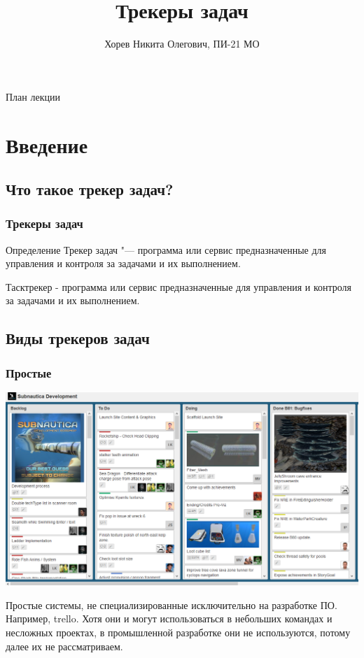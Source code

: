 \documentclass{../industrial-development}
\title{Трекеры задач}
\author{Хорев Никита Олегович, ПИ-21 МО}
\date{}
\begin{document}
\begin{frame}
  \titlepage
\end{frame}


\begin{frame}{План лекции}
  \tableofcontents
\end{frame}

\section{Введение}

\subsection{Что такое трекер задач?}

\begin{frame} \frametitle{Трекеры задач}
  \begin{block}{Определение}
    Трекер задач "--- программа или сервис предназначенные для управления и контроля за задачами и их выполнением.
  \end{block}
\end{frame}

\lecturenotes
Тасктрекер - программа или сервис предназначенные для управления и контроля за задачами и их выполнением.

\subsection{Виды трекеров задач}

\begin{frame} \frametitle{Простые}
	\centerline{\includegraphics[width=\textwidth]{trello.png}}
\end{frame}

\lecturenotes
Простые системы, не специализированные исключительно на разработке ПО. Например, trello. Хотя они и могут использоваться в небольших командах и несложных проектах, в промышленной разработке они не используются, потому далее их не рассматриваем.
\end{document}
